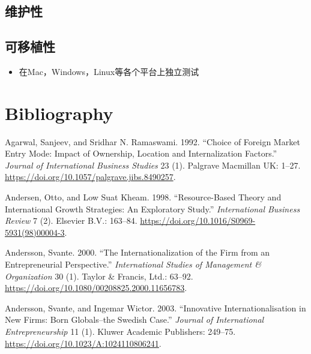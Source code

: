 \documentclass[hyperref, a4paper]{ctexart}
\providecommand{\tightlist}{%
  \setlength{\itemsep}{0pt}\setlength{\parskip}{0pt}}
\begin{document}
\hypertarget{ux7ef4ux62a4ux6027}{%
\subsection{维护性}\label{ux7ef4ux62a4ux6027}}

\hypertarget{ux53efux79fbux690dux6027}{%
\subsection{可移植性}\label{ux53efux79fbux690dux6027}}

\begin{itemize}
\tightlist
\item
  在Mac，Windows，Linux等各个平台上独立测试
\end{itemize}

\pagebreak

\hypertarget{bibliography}{%
\section*{Bibliography}\label{bibliography}}

\hypertarget{refs}{}
\leavevmode\hypertarget{ref-innovative4}{}%
Agarwal, Sanjeev, and Sridhar N. Ramaswami. 1992. ``Choice of Foreign
Market Entry Mode: Impact of Ownership, Location and Internalization
Factors.'' \emph{Journal of International Business Studies} 23 (1).
Palgrave Macmillan UK: 1--27.
\url{https://doi.org/10.1057/palgrave.jibs.8490257}.

\leavevmode\hypertarget{ref-innovative5}{}%
Andersen, Otto, and Low Suat Kheam. 1998. ``Resource-Based Theory and
International Growth Strategies: An Exploratory Study.''
\emph{International Business Review} 7 (2). Elsevier B.V.: 163--84.
\url{https://doi.org/10.1016/S0969-5931(98)00004-3}.

\leavevmode\hypertarget{ref-innovative1}{}%
Andersson, Svante. 2000. ``The Internationalization of the Firm from an
Entrepreneurial Perspective.'' \emph{International Studies of Management
\& Organization} 30 (1). Taylor \& Francis, Ltd.: 63--92.
\url{https://doi.org/10.1080/00208825.2000.11656783}.

\leavevmode\hypertarget{ref-innovativeInternationalisation}{}%
Andersson, Svante, and Ingemar Wictor. 2003. ``Innovative
Internationalisation in New Firms: Born Globals--the Swedish Case.''
\emph{Journal of International Entrepreneurship} 11 (1). Kluwer Academic
Publishers: 249--75. \url{https://doi.org/10.1023/A:1024110806241}.
\end{document}
